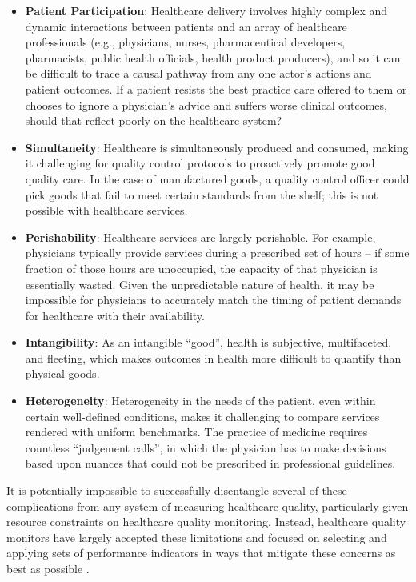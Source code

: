 \documentclass[12pt]{article}
\begin{document}
\begin{itemize}
  \item \textbf{Patient Participation}: Healthcare delivery involves highly complex and dynamic interactions between patients and an array of healthcare professionals (e.g., physicians, nurses, pharmaceutical developers, pharmacists, public health officials, health product producers), and so it can be difficult to trace a causal pathway from any one actor's actions and patient outcomes. If a patient resists the best practice care offered to them or chooses to ignore a physician's advice and suffers worse clinical outcomes, should that reflect poorly on the healthcare system?
  \item \textbf{Simultaneity}: Healthcare is simultaneously produced and consumed, making it challenging for quality control protocols to proactively promote good quality care. In the case of manufactured goods, a quality control officer could pick goods that fail to meet certain standards from the shelf; this is not possible with healthcare services.
  \item \textbf{Perishability}: Healthcare services are largely perishable. For example, physicians typically provide services during a prescribed set of hours -- if some fraction of those hours are unoccupied, the capacity of that physician is essentially wasted. Given the unpredictable nature of health, it may be impossible for physicians to accurately match the timing of patient demands for healthcare with their availability.
  \item \textbf{Intangibility}: As an intangible ``good'', health is subjective, multifaceted, and fleeting, which makes outcomes in health more difficult to quantify than physical goods.
  \item \textbf{Heterogeneity}: Heterogeneity in the needs of the patient, even within certain well-defined conditions, makes it challenging to compare services rendered with uniform benchmarks. The practice of medicine requires countless ``judgement calls'', in which the physician has to make decisions based upon nuances that could not be prescribed in professional guidelines.
\end{itemize}

It is potentially impossible to successfully disentangle several of these complications from any system of measuring healthcare quality, particularly given resource constraints on healthcare quality monitoring. Instead, healthcare quality monitors have largely accepted these limitations and focused on selecting and applying sets of performance indicators in ways that mitigate these concerns as best as possible \citep{bennettNICEProcessDeveloping2014}.
\end{document}
